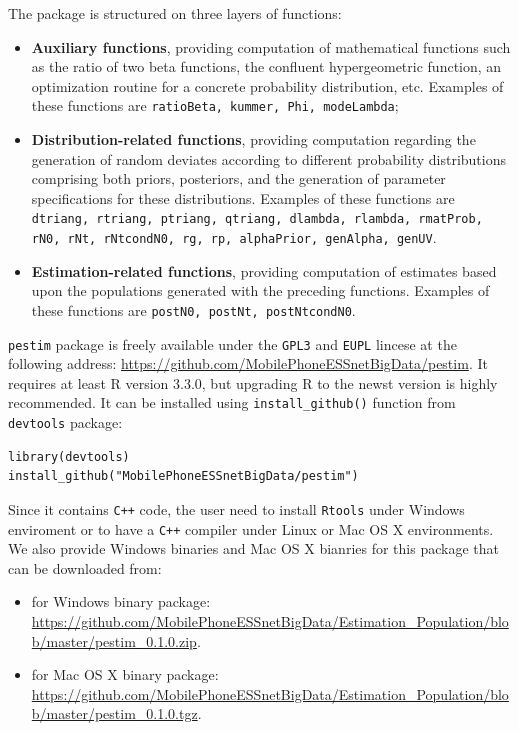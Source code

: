 \documentclass[12pt, a4paper]{article}
\begin{document}
The package is structured on three layers of functions:
\begin{itemize}
	\item \textbf{Auxiliary functions}, providing computation of mathematical functions 
such as the ratio of two beta functions, the confluent hypergeometric function, 
an optimization routine for a concrete probability distribution, etc. 
Examples of these functions are \texttt{ratioBeta, kummer, Phi, modeLambda};
	\item \textbf{Distribution-related functions}, providing computation regarding
the generation of random deviates according to different probability distributions 
comprising both priors, posteriors, and the generation of parameter specifications 
for these distributions. Examples of these functions are 
\texttt{dtriang, rtriang, ptriang, qtriang, dlambda, rlambda, rmatProb, rN0, rNt, rNtcondN0, rg, rp, alphaPrior, genAlpha, genUV}.
\item \textbf{Estimation-related functions}, providing computation of estimates 
based upon the populations generated with the preceding functions. 
Examples of these functions are \texttt{postN0, postNt, postNtcondN0}.
\end{itemize}

\texttt{pestim} package is freely available under the \texttt{GPL3} and \texttt{EUPL} lincese 
at the following address: \url{https://github.com/MobilePhoneESSnetBigData/pestim}. It requires 
at least R version 3.3.0, but upgrading R to the newst version is highly recommended.
It can be installed using \texttt{install\_github()} function from \texttt{devtools} package:
\begin{verbatim}
library(devtools)
install_github("MobilePhoneESSnetBigData/pestim")
\end{verbatim}

Since it contains \texttt{C++} code, the user need to install \texttt{Rtools} under Windows 
enviroment or to have a  \texttt{C++}  compiler under Linux or Mac OS X environments.
We also provide Windows binaries and Mac OS X bianries for this package that can be downloaded from:
\begin{itemize}
	\item for Windows binary package: \url{https://github.com/MobilePhoneESSnetBigData/Estimation_Population/blob/master/pestim_0.1.0.zip}.
	\item for Mac OS X binary package: \url{https://github.com/MobilePhoneESSnetBigData/Estimation_Population/blob/master/pestim_0.1.0.tgz}.
\end{itemize}
\end{document}
